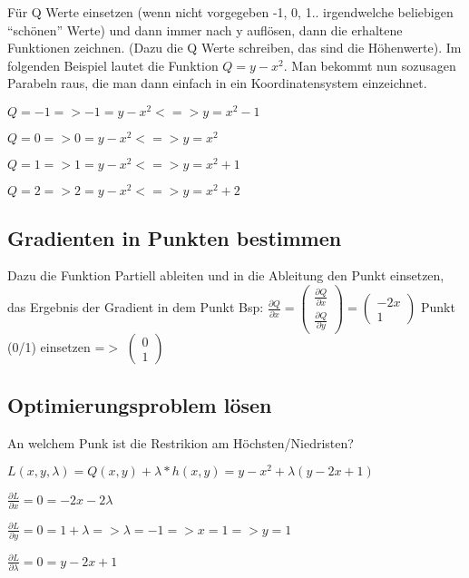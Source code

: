\documentclass[a4paper, 11pt]{article}
\begin{document}
Für Q Werte einsetzen (wenn nicht vorgegeben -1, 0, 1.. irgendwelche beliebigen
``schönen'' Werte) und dann immer nach y auflösen, dann die erhaltene Funktionen
zeichnen. (Dazu die Q Werte schreiben, das sind die Höhenwerte). Im folgenden
Beispiel lautet die Funktion $Q = y - x^2$. Man bekommt nun sozusagen Parabeln
raus, die man dann einfach in ein Koordinatensystem einzeichnet. \newline

$Q = -1 => -1 = y - x^2 <=> y = x^2 -1$

$Q = 0 => 0 = y - x^2 <=> y = x^2$

$Q = 1 => 1 = y - x^2 <=> y = x^2 +1$

$Q = 2 => 2 = y - x^2 <=> y = x^2 +2$


\subsection{Gradienten in Punkten bestimmen}

Dazu die Funktion Partiell ableiten und in die Ableitung den Punkt einsetzen,
das Ergebnis der Gradient in dem Punkt \newline
Bsp: $\frac{\partial Q}{\partial x} = 
\begin{pmatrix}
	\frac{\partial Q}{\partial x} \\
	\frac{\partial Q}{\partial y}
\end{pmatrix}
=  
\begin{pmatrix} 
	-2x \\
	1
\end{pmatrix}$ \newline
\newline
Punkt (0/1) einsetzen =$>$ 
$\begin{pmatrix}
	0\\
	1
\end{pmatrix}$ 

\subsection{Optimierungsproblem lösen}

An welchem Punk ist die Restrikion am Höchsten/Niedristen? \newline

$L(x,y,\lambda) = Q(x,y) + \lambda * h(x,y) = y-x^2+\lambda(y-2x+1)$ \newline

\begin{compactenum}[(1)] 
\item $\frac{\partial L}{\partial x} = 0 = -2x-2\lambda$ 
\item $\frac{\partial L}{\partial y} = 0 = 1 + \lambda => \lambda = -1 => x = 1
	=> y = 1$
\item $\frac{\partial L}{\partial \lambda} = 0 = y-2x+1$ \newline
\end{compactenum}
\end{document}
